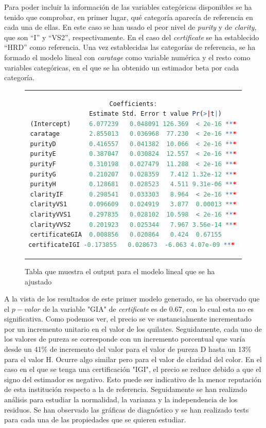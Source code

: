 \documentclass[a4paper, 7pt]{article}
\begin{document}
Para poder incluir la información de las variables categóricas disponibles se ha tenido que comprobar, en primer lugar, qué categoría aparecía de referencia en cada una de ellas. En este caso se han usado el peor nivel de \textit{purity} y de \textit{clarity}, que son “I” y “VS2”, respectivamente. En el caso del \textit{certificate} se ha establecido “HRD” como referencia.
Una vez establecidas las categorías de referencia, se ha formado el modelo lineal con \textit{caratage} como variable numérica y el resto como variables categóricas, en el que se ha obtenido un estimador beta por cada categoría.

\begin{figure}[h!]
    \centering
    \begin{tabular}{c}
        \begin{lstlisting}[basicstyle=\tiny, language=r]
               Coefficients:
                Estimate Std. Error t value Pr(>|t|)    
(Intercept)     6.077239   0.048091 126.369  < 2e-16 ***
caratage        2.855013   0.036968  77.230  < 2e-16 ***
purityD         0.416557   0.041382  10.066  < 2e-16 ***
purityE         0.387047   0.030824  12.557  < 2e-16 ***
purityF         0.310198   0.027479  11.288  < 2e-16 ***
purityG         0.210207   0.028359   7.412 1.32e-12 ***
purityH         0.128681   0.028523   4.511 9.31e-06 ***
clarityIF       0.298541   0.033303   8.964  < 2e-16 ***
clarityVS1      0.096609   0.024919   3.877  0.00013 ***
clarityVVS1     0.297835   0.028102  10.598  < 2e-16 ***
clarityVVS2     0.201923   0.025344   7.967 3.56e-14 ***
certificateGIA  0.008856   0.020864   0.424  0.67155    
certificateIGI -0.173855   0.028673  -6.063 4.07e-09 *** 
        \end{lstlisting}
    \end{tabular}
    \caption{Tabla que muestra el output para el modelo lineal que se ha ajustado}
    \label{fig:summary_model}
\end{figure}

A la vista de los resultados de este primer modelo generado, se ha observado que el $p-valor$ de la variable "GIA" de  \textit{certificate} es de 0.67, con lo cual esta no es significativa. Como podemos ver, el precio se ve sustancialmente incrementado por un incremento unitario en el valor de los quilates. Seguidamente, cada uno de los valores de pureza se corresponde con un incremento porcentual que varía desde un 41\% de incremento del valor para el valor de pureza D hasta un 13\% para el valor H. Ocurre algo similar pero para el valor de claridad del color. En el caso en el que se tenga una certificación "IGI", el precio se reduce debido a que el signo del estimador es negativo. Esto puede ser indicativo de la menor reputación de esta institución respecto a la de referencia. Seguidamente se han realizado análisis para estudiar la normalidad, la varianza y la independencia de los residuos. Se han observado las gráficas de diagnóstico  y se han realizado tests para cada una de las propiedades que se quieren estudiar.
\end{document}
